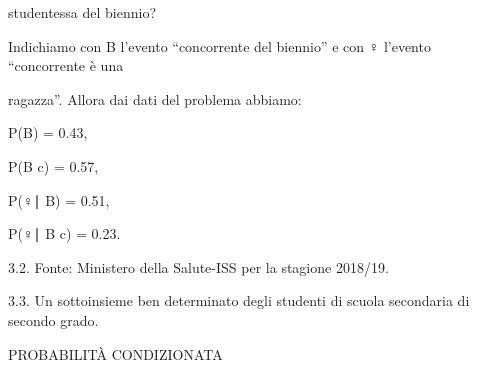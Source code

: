 \documentclass[a4paper,portrait,12pt]{article}
\begin{document}
\begin{flushleft}
studentessa del biennio?
\end{flushleft}


\begin{flushleft}
Indichiamo con B l'evento ``concorrente del biennio'' e con ♀ l'evento ``concorrente \`{e} una
\end{flushleft}


\begin{flushleft}
ragazza''. Allora dai dati del problema abbiamo:
\end{flushleft}


\begin{flushleft}
P(B) = 0.43,
\end{flushleft}





\begin{flushleft}
P(B c) = 0.57,
\end{flushleft}





\begin{flushleft}
P(♀∣ B) = 0.51,
\end{flushleft}





\begin{flushleft}
P(♀∣ B c) = 0.23.
\end{flushleft}





\begin{flushleft}
3.2. Fonte: Ministero della Salute-ISS per la stagione 2018/19.
\end{flushleft}


\begin{flushleft}
3.3. Un sottoinsieme ben determinato degli studenti di scuola secondaria di secondo grado.
\end{flushleft}










\begin{flushleft}
PROBABILIT\`{A} CONDIZIONATA
\end{flushleft}
\end{document}
